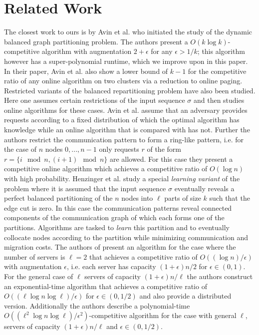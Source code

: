 \documentclass[a4paper,UKenglish,cleveref, autoref, thm-restate,authorcolumns]{../lipics/lipics-v2019}
\newcommand{\opt}{\text{O{\scriptsize PT}}}
\begin{document}
\section{Related Work}
\label{sec:related_work}

The closest work to ours is by Avin et al. \cite{Avin2015} 
who initiated the study of the dynamic balanced graph partitioning 
problem. The authors present a $O(k \log k)$-competitive algorithm 
with augmentation $2+\epsilon$ for any $\epsilon>1/k$;
this algorithm however has a super-polynomial runtime,
which we improve upon in this paper.  
In their paper, Avin et al. also show a lower bound of $k-1$ for the competitive ratio of any online algorithm 
on two clusters via a reduction to online paging. 
Restricted variants of the balanced repartitioning problem have also been studied. Here one assumes certain restrictions of the input sequence $\sigma$ and then studies online algorithms for these cases. 
Avin et al. \cite{Avin2018} 
assume that an adversary provides requests according to a fixed distribution of which the optimal algorithm \opt{} has knowledge while an online algorithm that is compared with \opt{} has not. Further the authors restrict the communication pattern to form a ring-like pattern, i.e. for the case of $n$ nodes $0,...,n-1$ only requests $r$ of the form $r=\{i \mod n, (i+1)\mod n\}$ are allowed. For this case they present a competitive online algorithm which achieves a competitive ratio of $O(\log n)$ with high probability.	
Henzinger et al. \cite{Henzinger2019} 
study a special \textit{learning variant} of the problem 
where it is assumed that the input sequence $\sigma$ eventually reveals a perfect balanced partitioning of the $n$ nodes into $\ell$ parts of size $k$ such that the edge cut is zero. In this case the communication patterns reveal connected components of the communication graph of which each forms one of the partitions. Algorithms are tasked to \textit{learn} this partition and to eventually collocate nodes according to the partition while minimizing communication and migration costs.
The authors of \cite{Henzinger2019} present an algorithm for the case where the number of servers is $\ell=2$ that achieves a competitive ratio of $O((\log n)/\epsilon)$ with augmentation $\epsilon$, i.e. each server has capacity $(1+\epsilon)n/2$ for $\epsilon\in(0,1)$.
For the general case of $\ell$ servers of capacity $(1+\epsilon)n/\ell$ the authors construct an exponential-time algorithm that achieves a competitive ratio of $O((\ell\log n \log \ell)/\epsilon)$ for $\epsilon\in(0,1/2)$ and also provide a distributed version.
Additionally the authors describe a polynomial-time $O((\ell^2\log n\log \ell)/\epsilon^2)$-competitive algorithm for the case with general $\ell$, servers of capacity $(1+\epsilon)n/\ell$ and $\epsilon\in(0,1/2)$.
\end{document}
